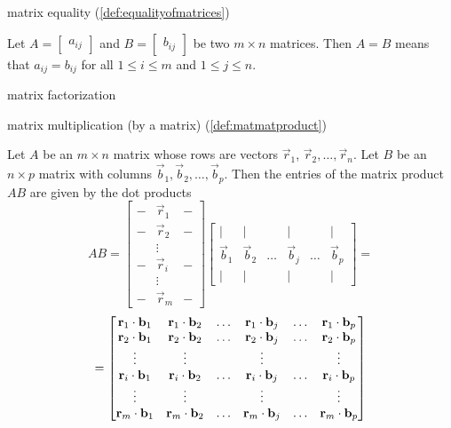 \documentclass{ximera}
\begin{document}
matrix equality (\ref{def:equalityofmatrices})
\begin{expandable}
    Let $A=\begin{bmatrix} a_{ij}\end{bmatrix}$ and $B=\begin{bmatrix} b_{ij}\end{bmatrix}$ be two $m \times n$ matrices. Then $A=B$ means
that $a_{ij}=b_{ij}$ for all $1\leq i\leq m$ and 
$1\leq j\leq n$.
\end{expandable}

matrix factorization

matrix multiplication (by a matrix) (\ref{def:matmatproduct})
\begin{expandable}
    Let $A$ be an $m\times n$ matrix whose rows are vectors $\vec{r}_1$, $\vec{r}_2,\ldots ,\vec{r}_n$.  Let $B$ be an $n\times p$ matrix with columns $\vec{b}_1, \vec{b}_2, \ldots, \vec{b}_p$.  Then the entries of the matrix product $AB$ are given by the dot products
$$AB=\begin{bmatrix}-&\vec{r}_1&-\\-&\vec{r}_2&-\\ &\vdots & \\-&\vec{r}_i &-\\ &\vdots& \\-&\vec{r}_m&-\end{bmatrix}\begin{bmatrix}|&|&&|&&|\\\vec{b}_1& \vec{b}_2 &\ldots  & \vec{b}_j&\ldots& \vec{b}_p\\|&|&&|&&|\end{bmatrix}=$$
$$=\begin{bmatrix}\mathbf{r}_1\cdot \mathbf{b}_1&\mathbf{r}_1\cdot \mathbf{b}_2&\ldots&\mathbf{r}_1\cdot \mathbf{b}_j&\ldots &\mathbf{r}_1\cdot \mathbf{b}_p\\\mathbf{r}_2\cdot \mathbf{b}_1&\mathbf{r}_2\cdot \mathbf{b}_2&\ldots&\mathbf{r}_2\cdot \mathbf{b}_j&\ldots &\mathbf{r}_2\cdot \mathbf{b}_p\\\vdots&\vdots&&\vdots&&\vdots\\\mathbf{r}_i\cdot \mathbf{b}_1&\mathbf{r}_i\cdot \mathbf{b}_2&\ldots&\mathbf{r}_i\cdot \mathbf{b}_j&\ldots &\mathbf{r}_i\cdot \mathbf{b}_p\\\vdots&\vdots&&\vdots&&\vdots\\\mathbf{r}_m\cdot \mathbf{b}_1&\mathbf{r}_m\cdot \mathbf{b}_2&\ldots&\mathbf{r}_m\cdot \mathbf{b}_j&\ldots &\mathbf{r}_m\cdot \mathbf{b}_p\end{bmatrix}
$$
\end{expandable}
\end{document}
